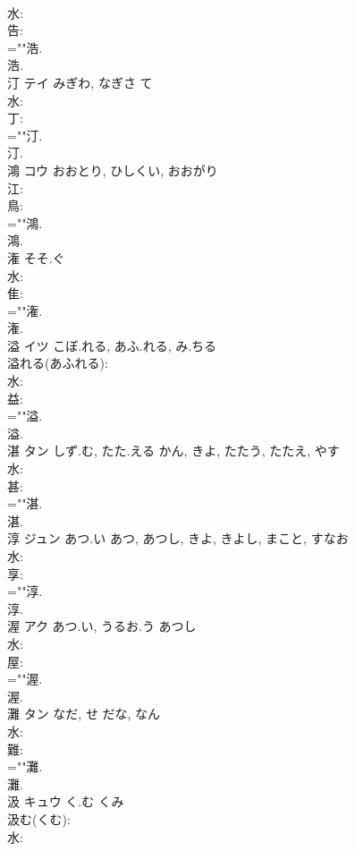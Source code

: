 \documentclass[8pt]{extreport}
\begin{document}
\begin{CJK}{UTF8}{min}
\\	水: 
\\	告: 
\\	=""浩.
\\	浩.
\\	汀	テイ	みぎわ, なぎさ	て	
\\	水: 
\\	丁: 
\\	=""汀.
\\	汀.
\\	鴻	コウ	おおとり, ひしくい, おおがり		
\\	江: 
\\	鳥: 
\\	=""鴻.
\\	鴻.
\\	潅		そそ.ぐ				
\\	水: 
\\	隹: 
\\	=""潅.
\\	潅.
\\	溢	イツ	こぼ.れる, あふ.れる, み.ちる		
\\	溢れる(あふれる): 
\\	水: 
\\	益: 
\\	=""溢.
\\	溢.
\\	湛	タン	しず.む, たた.える	かん, きよ, たたう, たたえ, やす	
\\	水: 
\\	甚: 
\\	=""湛.
\\	湛.
\\	淳	ジュン	あつ.い	あつ, あつし, きよ, きよし, まこと, すなお	
\\	水: 
\\	享: 
\\	=""淳.
\\	淳.
\\	渥	アク	あつ.い, うるお.う	あつし	
\\	水: 
\\	屋: 
\\	=""渥.
\\	渥.
\\	灘	タン	なだ, せ	だな, なん	
\\	水: 
\\	難: 
\\	=""灘.
\\	灘.
\\	汲	キュウ	く.む	くみ	
\\	汲む(くむ): 
\\	水: 

\end{CJK}
\end{document}
